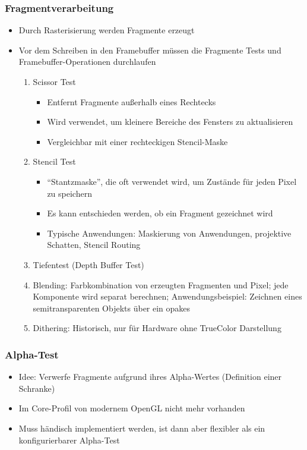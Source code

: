 \subsubsection{Fragmentverarbeitung}
\begin{itemize}
	\item Durch Rasterisierung werden Fragmente erzeugt
	\item Vor dem Schreiben in den Framebuffer müssen die Fragmente Tests und Framebuffer-Operationen durchlaufen
	\begin{enumerate}
		\item Scissor Test
		\begin{itemize}
			\item Entfernt Fragmente außerhalb eines Rechtecks
			\item Wird verwendet, um kleinere Bereiche des Fensters zu aktualisieren
			\item Vergleichbar mit einer rechteckigen Stencil-Maske
		\end{itemize}
		\item Stencil Test
		\begin{itemize}
			\item "`Stantzmaske"', die oft verwendet wird, um Zustände für jeden Pixel zu speichern
			\item Es kann entschieden werden, ob ein Fragment gezeichnet wird
			\item Typische Anwendungen: Maskierung von Anwendungen, projektive Schatten, Stencil Routing
		\end{itemize}
		\item Tiefentest (Depth Buffer Test)
		\item Blending: Farbkombination von erzeugten Fragmenten und Pixel; jede Komponente wird separat berechnen; Anwendungsbeispiel: Zeichnen eines semitransparenten Objekts über ein opakes
		\item Dithering: Historisch, nur für Hardware ohne TrueColor Darstellung
	\end{enumerate}
\end{itemize}

\subsubsection{Alpha-Test}
\begin{itemize}
	\item Idee: Verwerfe Fragmente aufgrund ihres Alpha-Wertes (Definition einer Schranke)
	\item Im Core-Profil von modernem OpenGL nicht mehr vorhanden
	\item Muss händisch implementiert werden, ist dann aber flexibler als ein konfigurierbarer Alpha-Test
\end{itemize}

